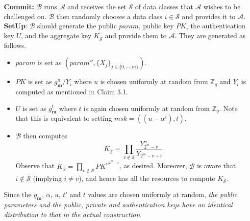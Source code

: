 \noindent \textbf{Commit:} $\mathcal{B}$ runs $\mathcal{A}$ and receives the set $\mathcal{S}$ of data classes that $\mathcal{A}$ wishes to be challenged on. $\mathcal{B}$ then randomly chooses a data class $i\in\mathcal{S}$ and provides it to $\mathcal{A}$.\\
 
\noindent \textbf{SetUp}: $\mathcal{B}$ should generate the public $param$, public key $PK$, the authentication key $U$, and the aggregate key $K_{\overline{\mathcal{S}}}$ and provide them to $\mathcal{A}$. They are generated as follows.
\begin{itemize}
  \item $param$ is set as $(param'',\{X_j\}_{j\in\{0,\cdots,m\}})$.
  \item $PK$ is set as ${g^u_{\mathbf{m}}}/{Y_i}$ where $u$ is chosen uniformly at random from $\mathbb{Z}_q$ and $Y_i$ is computed as mentioned in Claim 3.1. 
  \item $U$ is set as $g^{t}_{\mathbf{m}}$ where $t$ is again chosen uniformly at random from $\mathbb{Z}_q$. Note that this is equivalent to setting $msk=((u-\alpha^i),t)$.
  \item $\mathcal{B}$ then computes   
  \begin{equation}
   K_{\overline{\mathcal{S}}} = \prod_{v\notin\mathcal{S}}\frac{Y^{u}_{2^m-v}}{Y_{2^m-v+i}}\nonumber
  \end{equation}
  \noindent Observe that $K_{\overline{\mathcal{S}}}=\prod_{v\notin\mathcal{S}}PK^{\alpha^{2^m-v}}$, as desired. Moreover, $\mathcal{B}$ is aware that $i\notin \overline{\mathcal{S}}$ (implying $i\neq v$), and hence has all the resources to compute $K_{\overline{\mathcal{S}}}$.  
\end{itemize}
 
\noindent Since the $g_{\mathbf{m}}$, $\alpha$, $u$, $t'$ and $t$ values are chosen uniformly at random, \emph{the public parameters and the public, private and authentication keys have an identical distribution to that in the actual construction}.\\
 
